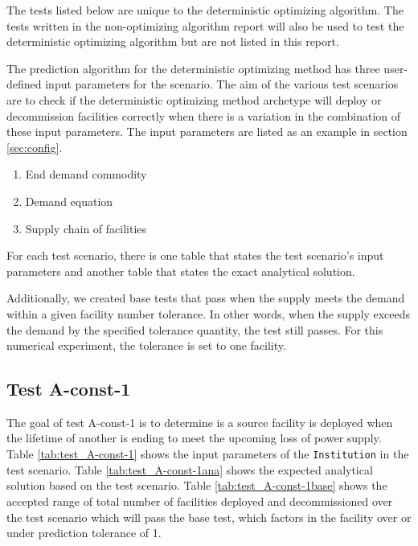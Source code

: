 \documentclass[11pt,letterpaper]{article}
\begin{document}
The tests listed below are unique to the deterministic optimizing algorithm. The tests written in the non-optimizing algorithm report will also be used to test the deterministic optimizing algorithm but are not listed in this report.

The prediction algorithm for the deterministic optimizing method has three user-defined input parameters for the scenario.
The aim of the various test scenarios are to check if the
deterministic optimizing method archetype will deploy or decommission facilities correctly when there is a variation
in the combination of these input parameters. The input parameters are listed as an example in section \ref{sec:config}.

\begin{enumerate}
	\item End demand commodity
	\item Demand equation 
	\item Supply chain of facilities
\end{enumerate}

For each test scenario, there is one table that states the test scenario's input parameters and another table that states the exact analytical solution. 

Additionally, we created base tests that pass when the supply meets the demand within a given facility number tolerance.
In other words, when the supply exceeds the demand by the specified tolerance quantity, the test still passes. For this numerical experiment, the tolerance is set to one facility. 

\subsection{Test A-const-1}
The goal of test A-const-1 is to determine is a source facility is deployed when the lifetime of another is ending to meet the upcoming loss of power supply. 
Table \ref{tab:test_A-const-1} shows the input parameters of the \texttt{Institution} in the test scenario. Table \ref{tab:test_A-const-1ana} shows the expected analytical solution based on the test scenario. Table \ref{tab:test_A-const-1base} shows the accepted range of total number of facilities deployed and decommissioned over the test scenario which will pass the base test, which factors in the facility over or under prediction tolerance of 1.
\end{document}
